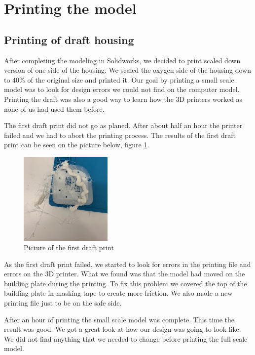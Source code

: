 \section{Printing the model}

\subsection{Printing of draft housing} 

After completing the modeling in Solidworks, we decided to print scaled down version of one side of the housing. We scaled the oxygen side of the housing down to 40\% of the original size and printed it. Our goal by printing a small scale model was to look for design errors we could not find on the computer model. Printing the draft was also a good way to learn how the 3D printers worked as none of us had used them before.

The first draft print did not go as planed. After about half an hour the printer failed and we had to abort the printing process. The results of the first draft print can be seen on the picture below, figure \ref{fig:Draft1}.


\begin{figure}[ht]
    \centering
    \includegraphics[width=0.40\textwidth]{DIV./Bilder/Draft1.jpg}
    \caption{Picture of the first draft print}
    \label{fig:Draft1}
\end{figure}

As the first draft print failed, we started to look for errors in the printing file and errors on the 3D printer. What we found was that the model had moved on the building plate during the printing. To fix this problem we covered the top of the building plate in masking tape to create more friction. We also made a new printing file just to be on the safe side. 

After an hour of printing the small scale model was complete. This time the result was good. We got a great look at how our design was going to look like. We did not find anything that we needed to change before printing the full scale model.

